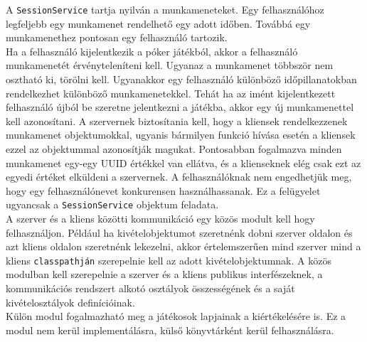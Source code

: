 A \texttt{SessionService} tartja nyilván a munkameneteket. Egy felhasználóhoz legfeljebb egy munkamenet rendelhető egy adott időben. Továbbá egy munkamenethez pontosan egy felhasználó tartozik. \\
Ha a felhasználó kijelentkezik a póker játékból, akkor a felhasználó munkamenetét érvényteleníteni kell. Ugyanaz a munkamenet többször nem osztható ki, törölni kell. Ugyanakkor egy felhasználó különböző időpillanatokban rendelkezhet különböző munkamenetekkel. Tehát ha az imént kijelentkezett felhasználó újból be szeretne jelentkezni a játékba, akkor egy új munkamenettel kell azonosítani. A szervernek biztosítania kell, hogy a kliensek rendelkezzenek munkamenet objektumokkal, ugyanis bármilyen funkció hívása esetén a kliensek ezzel az objektummal azonosítják magukat. Pontosabban fogalmazva minden munkamenet egy-egy UUID értékkel van ellátva, és a klienseknek elég csak ezt az egyedi értéket elküldeni a szervernek. A felhasználóknak nem engedhetjük meg, hogy egy felhasználónevet konkurensen használhassanak. Ez a felügyelet ugyancsak a \texttt{SessionService} objektum feladata. \\
A szerver és a kliens közötti kommunikáció egy közös modult kell hogy felhasználjon. Például ha kivételobjektumot szeretnénk dobni szerver oldalon és azt kliens oldalon szeretnénk lekezelni, akkor értelemszerűen mind szerver mind a kliens \texttt{classpathján} szerepelnie kell az adott kivételobjektumnak. A közös modulban kell szerepelnie a szerver és a kliens publikus interfészeknek, a kommunikációs rendszert alkotó osztályok összességének és a saját kivételosztályok definícióinak. \\
Külön modul fogalmazható meg a játékosok lapjainak a kiértékelésére is. Ez a modul nem kerül implementálásra, külső könyvtárként kerül felhasználásra.

